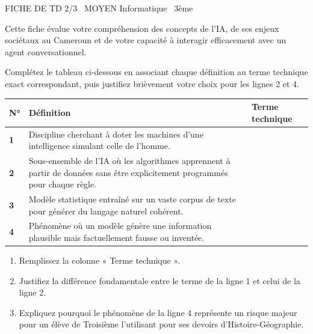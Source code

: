 \documentclass[11pt]{article}
\begin{document}
\begin{tcolorbox}[enhanced,colback=popink,colframe=popink,arc=10pt,boxrule=0pt,left=12pt,right=12pt,top=9pt,bottom=9pt]
{\color{white}\popxbold\small FICHE DE TD 2/3 \textbullet\ MOYEN \hfill Informatique \textbullet\ 3ème\par}
\end{tcolorbox}
\vspace{4pt}
Cette fiche évalue votre compréhension des concepts de l'IA, de ses enjeux sociétaux au Cameroun et de votre capacité à interagir efficacement avec un agent conversationnel.

\begin{exercice}
Complétez le tableau ci-dessous en associant chaque définition au terme technique exact correspondant, puis justifiez brièvement votre choix pour les lignes 2 et 4.

\begin{tabularx}{\linewidth}{|>{\bfseries}l|X|X|}
\hline
\textbf{N°} & \textbf{Définition} & \textbf{Terme technique} \\
\hline
1 & Discipline cherchant à doter les machines d'une intelligence simulant celle de l'homme. & \\
\hline
2 & Sous-ensemble de l'IA où les algorithmes apprennent à partir de données sans être explicitement programmés pour chaque règle. & \\
\hline
3 & Modèle statistique entraîné sur un vaste corpus de texte pour générer du langage naturel cohérent. & \\
\hline
4 & Phénomène où un modèle génère une information plausible mais factuellement fausse ou inventée. & \\
\hline
\end{tabularx}

\begin{enumerate}
    \item Remplissez la colonne « Terme technique ».
    \item Justifiez la différence fondamentale entre le terme de la ligne 1 et celui de la ligne 2.
    \item Expliquez pourquoi le phénomène de la ligne 4 représente un risque majeur pour un élève de Troisième l'utilisant pour ses devoirs d'Histoire-Géographie.
\end{enumerate}
\end{exercice}
\end{document}
